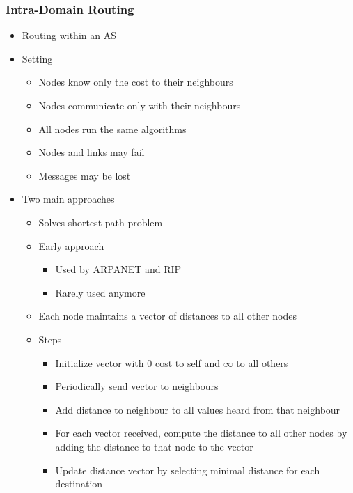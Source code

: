 \subsubsection{Intra-Domain Routing}
\begin{itemize}
    \item Routing within an AS
    \item Setting
        \begin{itemize}
            \item Nodes know only the cost to their neighbours
            \item Nodes communicate only with their neighbours
            \item All nodes run the same algorithms
            \item Nodes and links may fail
            \item Messages may be lost
        \end{itemize}
    \item Two main approaches
        \begin{itemize}
            \item Solves shortest path problem
            \item Early approach
                \begin{itemize}
                    \item Used by ARPANET and RIP
                    \item Rarely used anymore
                \end{itemize}
            \item Each node maintains a vector of distances to all other nodes
            \item Steps
                \begin{itemize}
                    \item Initialize vector with $0$ cost to self and $\infty$ to all others
                    \item Periodically send vector to neighbours
                    \item Add distance to neighbour to all values heard from that neighbour
                    \item For each vector received, compute the distance to all other nodes by adding the distance to that node to the vector
                    \item Update distance vector by selecting minimal distance for each destination
                \end{itemize}

\end{itemize}
\end{itemize}

